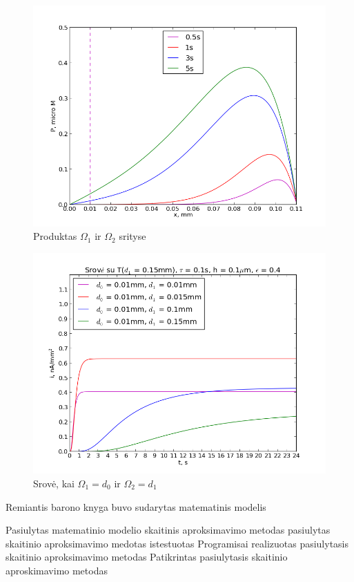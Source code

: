 \documentclass[12pt, a4paper, lithuanian]{article}
\begin{document}
 \begin{figure}[H]
     \centering
     \includegraphics[scale=0.5]{img/kurP}
     \caption{Produktas $\Omega_1$ ir $\Omega_2$ srityse}
     \label{img:mlp}
 \end{figure}
 
 \begin{figure}[H]
     \centering
     \includegraphics[scale=0.5]{img/kurI}
     \caption{Srovė, kai $\Omega_1 = d_0$ ir $\Omega_2 = d_1$}
     \label{img:mlp}
 \end{figure}

Remiantis barono knyga buvo sudarytas matematinis modelis

Pasiulytas matematinio modelio skaitinis aproksimavimo metodas
pasiulytas skaitinio aproksimavimo medotas istestuotas
Programisai realizuotas pasiulytasis skaitinio aproksimavimo metodas
Patikrintas pasiulytasis skaitinio aproskimavimo metodas
\end{document}
